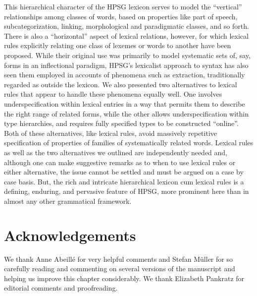 \documentclass[output=paper
 	        ,biblatex
                ,babelshorthands
                ,newtxmath
                ,draftmode
                ,colorlinks, citecolor=brown
]{langscibook}
\begin{document}
This hierarchical character of the HPSG lexicon serves to model the ``vertical'' relationships among classes of words, based on properties like part of speech, subcategorization, linking, morphological and paradigmatic classes, and so forth.
There is also a ``horizontal'' aspect of lexical relations, however, for which lexical rules explicitly relating one class of lexemes or words to another have been proposed.
While their original use was primarily to model systematic sets of, say, forms in an inflectional paradigm, HPSG's lexicalist approach to syntax has also seen them employed in accounts of phenomena such as extraction, traditionally regarded as outside the lexicon.
We also presented two alternatives to lexical rules that appear to handle these phenomena equally well.
One involves underspecification within lexical entries in a way that permits them to describe the right range of related forms, while the other allows underspecification within type hierarchies, and requires fully specified types to be constructed ``online''.
Both of these alternatives, like lexical rules, avoid massively repetitive specification of properties of families of systematically related words. Lexical rules as well as the two alternatives we outlined are independently needed and, although one can make suggestive remarks as to when to use lexical rules or either alternative, the issue cannot be settled  and must be argued on a case by case basis. But, the rich and intricate hierarchical lexicon cum lexical rules is a defining, enduring, and pervasive feature of HPSG, more prominent here than in almost any other grammatical framework.




 
\section*{Acknowledgements}

We thank Anne Abeillé for very helpful comments and Stefan Müller for so carefully reading and commenting on several versions of the manuscript  and helping us improve this chapter considerably. We thank Elizabeth Pankratz for editorial comments and proofreading.

{\sloppy
\printbibliography[heading=subbibliography,notkeyword=this] 
}
\end{document}
